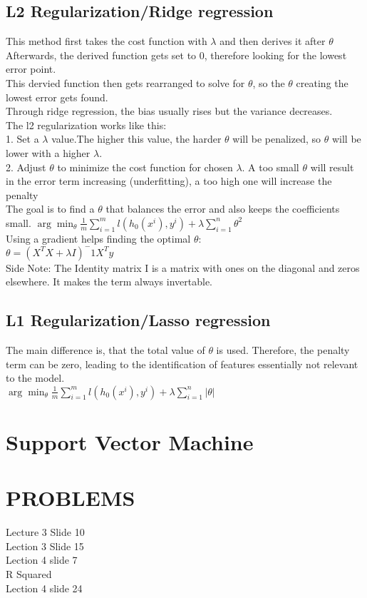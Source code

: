\documentclass{article}
\begin{document}
\subsection{L2 Regularization/Ridge regression}
This method first takes the cost function with $\lambda $ and then derives it after $\theta$ \\
Afterwards, the derived function gets set to 0, therefore looking for the lowest error point. \\ 
This dervied function then gets rearranged to solve for $\theta $, so the $\theta $ creating the lowest error gets found.\\
Through ridge regression, the bias usually rises but the variance decreases.\\
The l2 regularization works like this: \\
1. Set a $\lambda $ value.The higher this value, the harder $\theta $ will be penalized, so $\theta $ will be lower with a higher $\lambda $. \\ 
2. Adjust $\theta $ to minimize the cost function for chosen $\lambda$. A too small $\theta$ will result in the error term increasing (underfitting), a too high one will increase the penalty \\
The goal is to find a $\theta$ that balances the error and also keeps the coefficients small.
$\arg\min_{\theta} \frac{1}{m} \sum_{i = 1}^{m} l(h_0(x^i),y^i)+\lambda \sum_{i = 1}^{n}\theta^2$ \\
Using a gradient helps finding the optimal $\theta$: \\
$\theta = (X^TX+\lambda I)^-1X^Ty$\\
Side Note: The Identity matrix I is a matrix with ones on the diagonal and zeros elsewhere. It makes the term always invertable. \\
\subsection{L1 Regularization/Lasso regression}
The main difference is, that the total value of $\theta$ is used. Therefore, the penalty term can be zero, leading to the identification of features essentially not relevant to the model.
\\$\arg\min_{\theta} \frac{1}{m} \sum_{i = 1}^{m} l(h_0(x^i),y^i)+\lambda \sum_{i = 1}^{n} |  \theta |$ \\
\section{Support Vector Machine}


\section{PROBLEMS}
Lecture 3 Slide 10\\
Lection 3 Slide 15\\
Lection 4 slide 7\\
R Squared\\
Lection 4 slide 24\\
\end{document}
